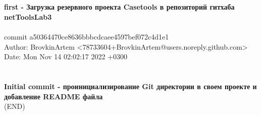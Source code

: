\documentclass{article}
\begin{document}
{\\ \\
    \textbf{first - Загрузка резервного проекта Casetools в репозиторий гитхаба netToolsLab3}
\\ \\
commit a50364470ce8636bbbcdcaee4597bef072c4d1e1 \\
Author: BrovkinArtem <78733604+BrovkinArtem@users.noreply.github.com> \\
Date:   Mon Nov 14 02:02:17 2022 +0300 \\
\\ \\
    \textbf{Initial commit - проинициализирование Git директории в своем проекте и добавление README файла} \\
(END)}
\\ \\ \large{}
\end{document}
